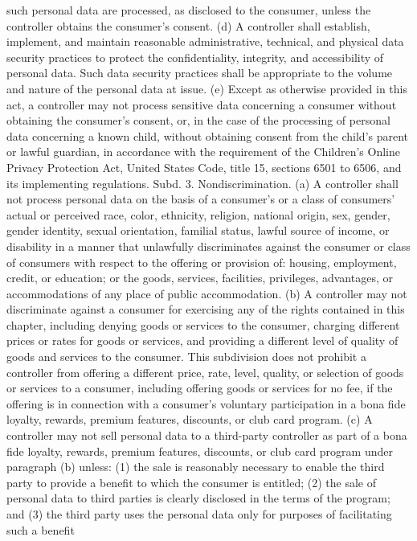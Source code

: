 such personal data are processed, as disclosed to the consumer, unless the controller obtains
the consumer's consent.
(d) A controller shall establish, implement, and maintain reasonable administrative,
technical, and physical data security practices to protect the confidentiality, integrity, and
accessibility of personal data. Such data security practices shall be appropriate to the volume
and nature of the personal data at issue.
(e) Except as otherwise provided in this act, a controller may not process sensitive data
concerning a consumer without obtaining the consumer's consent, or, in the case of the
processing of personal data concerning a known child, without obtaining consent from the
child's parent or lawful guardian, in accordance with the requirement of the Children's
Online Privacy Protection Act, United States Code, title 15, sections 6501 to 6506, and its
implementing regulations.
Subd. 3. Nondiscrimination. (a) A controller shall not process personal data on the
basis of a consumer's or a class of consumers' actual or perceived race, color, ethnicity,
religion, national origin, sex, gender, gender identity, sexual orientation, familial status,
lawful source of income, or disability in a manner that unlawfully discriminates against the
consumer or class of consumers with respect to the offering or provision of: housing,
employment, credit, or education; or the goods, services, facilities, privileges, advantages,
or accommodations of any place of public accommodation.
(b) A controller may not discriminate against a consumer for exercising any of the rights
contained in this chapter, including denying goods or services to the consumer, charging
different prices or rates for goods or services, and providing a different level of quality of
goods and services to the consumer. This subdivision does not prohibit a controller from
offering a different price, rate, level, quality, or selection of goods or services to a consumer,
including offering goods or services for no fee, if the offering is in connection with a
consumer's voluntary participation in a bona fide loyalty, rewards, premium features,
discounts, or club card program.
(c) A controller may not sell personal data to a third-party controller as part of a bona
fide loyalty, rewards, premium features, discounts, or club card program under paragraph
(b) unless:
(1) the sale is reasonably necessary to enable the third party to provide a benefit to which
the consumer is entitled;
(2) the sale of personal data to third parties is clearly disclosed in the terms of the
program; and
(3) the third party uses the personal data only for purposes of facilitating such a benefit
